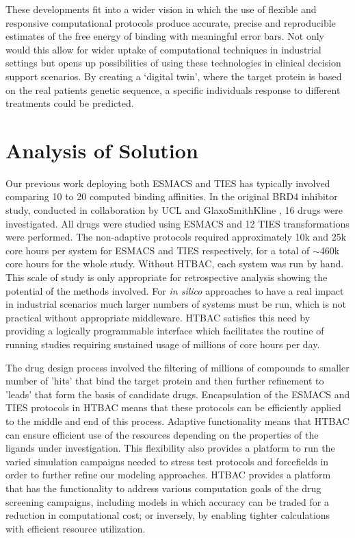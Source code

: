 \documentclass[conference]{IEEEtran}
\begin{document}
These developments fit into a wider vision in which the use of
flexible and responsive computational protocols produce accurate,
precise and reproducible estimates of the free energy of binding with
meaningful error bars. Not only would this allow for wider uptake of
computational techniques in industrial settings but opens up possibilities
of using these technologies in clinical decision support scenarios. By creating
a `digital twin', where the target protein is based on the real patients
genetic sequence, a specific individuals response to different
treatments could be predicted.


\section{Analysis of Solution}\label{sec:analysis}

Our previous work deploying both ESMACS and TIES has typically involved 
comparing 10 to 20 computed binding affinities. In the original BRD4 inhibitor 
study, conducted in collaboration by UCL and GlaxoSmithKline \cite{Wan2017brd4}, 
16 drugs were investigated. All drugs were studied using ESMACS and 12 TIES 
transformations were performed. The non-adaptive protocols required 
approximately 10k and 25k core hours per system for ESMACS and TIES 
respectively, for a total of  $\sim$460k core hours for the whole study. Without 
HTBAC, each system was run by hand. This scale of study is only appropriate for 
retrospective analysis showing the potential of the methods involved. For 
\textit{in silico} approaches to have a real impact in industrial scenarios much 
larger numbers of systems must be run, which is not practical without 
appropriate middleware. HTBAC satisfies this need by providing a logically 
programmable interface which facilitates the routine of running studies 
requiring sustained usage of millions of core hours per day.

The drug design process involved the filtering of millions of compounds to 
smaller number of 'hits' that bind the target protein and then further 
refinement to 'leads' that form the basis of candidate drugs. Encapsulation of 
the ESMACS and TIES protocols in HTBAC means that these protocols can be 
efficiently applied to the middle and end of this process. Adaptive 
functionality means that HTBAC can ensure efficient use of the resources 
depending on the properties of the ligands under investigation. This flexibility 
also provides a platform to run the varied simulation campaigns needed to stress 
test protocols and forcefields in order to further refine our modeling approaches.
HTBAC provides a platform that has the functionality to address various 
computation goals of the drug screening campaigns, including models in which 
accuracy can be traded for a reduction in computational cost; or inversely, by 
enabling tighter calculations with efficient resource utilization. 
\end{document}
